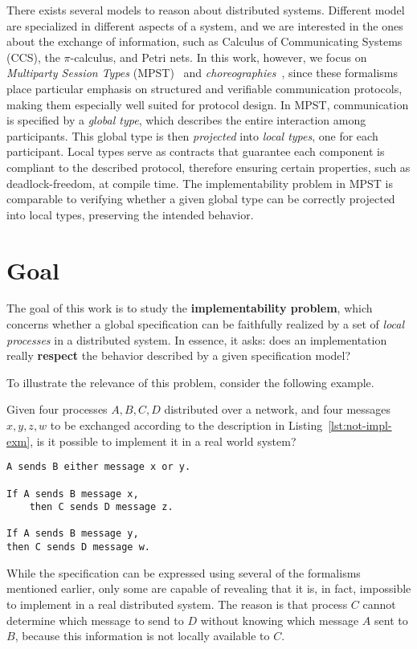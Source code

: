 There exists several models to reason about distributed systems.
Different model are specialized in different aspects of a system, and we
are interested in the ones about the exchange of information, such as
Calculus of Communicating Systems (CCS), the $\pi$-calculus, and Petri nets.
In this work, however, we focus on 
\textit{Multiparty Session Types} (MPST)~\cite{honda2008multiparty} 
and \textit{choreographies}~\cite{montesi2014choreographic}, 
since these formalisms place particular emphasis on structured and 
verifiable communication protocols, making them especially well suited 
for protocol design.
In MPST, communication is specified by a \emph{global type}, which 
describes the entire interaction among participants. 
This global type is then \emph{projected} into 
\emph{local types}, one for each participant. 
Local types serve as contracts that guarantee each component is compliant to 
the described protocol, therefore ensuring certain properties, 
such as deadlock-freedom, at compile time. 
The implementability problem in MPST is comparable to verifying 
whether a given global type can be correctly projected into local 
types, preserving the intended behavior.

\section{Goal}
The goal of this work is to study the \textbf{implementability
problem}, which concerns whether a global specification can be
faithfully realized by a set of \textit{local processes} in a
distributed system.
In essence, it asks: does an implementation really \textbf{respect}
the behavior described by a given specification model?

To illustrate the relevance of this problem, consider the following
example.
\begin{example}
Given four processes $A, B, C, D$ distributed over
a network, and four messages $x, y, z, w$ to be exchanged according to
the description in Listing~\ref{lst:not-impl-exm}, is it possible to
implement it in a real world system?

\begin{lstlisting}[caption={Example specification of message exchanges},
                   label={lst:not-impl-exm},
                   keywordstyle=\color{blue}\bfseries,morekeywords={sends,If,then}]
A sends B either message x or y.

If A sends B message x,
    then C sends D message z.

If A sends B message y,
then C sends D message w.
\end{lstlisting}
While the specification can be expressed using several of the
formalisms mentioned earlier, only some are capable of revealing that
it is, in fact, impossible to implement in a real distributed system.
The reason is that process $C$ cannot determine which message to send
to $D$ without knowing which message $A$ sent to $B$, because this 
information is not locally available to $C$.
\end{example}

